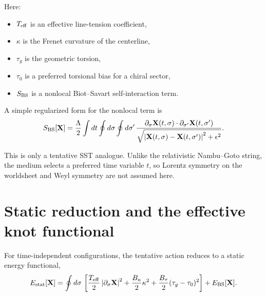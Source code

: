 \documentclass[12pt,a4paper]{article}
\begin{document}
        Here:
        \begin{itemize}
            \item \(T_{\rm eff}\) is an effective line-tension coefficient,
            \item \(\kappa\) is the Frenet curvature of the centerline,
            \item \(\tau_g\) is the geometric torsion,
            \item \(\tau_0\) is a preferred torsional bias for a chiral sector,
            \item \(S_{\rm BS}\) is a nonlocal Biot--Savart self-interaction term.
        \end{itemize}
        
        A simple regularized form for the nonlocal term is
        \begin{equation}
            S_{\rm BS}[\mathbf{X}] =
            \frac{\Lambda}{2}
            \int dt \oint d\sigma \oint d\sigma'\,
            \frac{
                \partial_\sigma \mathbf{X}(t,\sigma)\cdot
                \partial_{\sigma'} \mathbf{X}(t,\sigma')
            }{
                \sqrt{
                    \left|\mathbf{X}(t,\sigma)-\mathbf{X}(t,\sigma')\right|^2+\epsilon^2
                }
            }.
            \label{eq:BSterm}
        \end{equation}
        
        This is only a tentative SST analogue. Unlike the relativistic Nambu--Goto string, the medium selects a preferred time variable \(t\), so Lorentz symmetry on the worldsheet and Weyl symmetry are not assumed here.
    
    \section{Static reduction and the effective knot functional}
        
        For time-independent configurations, the tentative action reduces to a static energy functional,
        \begin{equation}
            E_{\rm stat}[\mathbf{X}] =
            \oint d\sigma\,
            \left[
                \frac{T_{\rm eff}}{2}\left|\partial_\sigma \mathbf{X}\right|^2
            +\frac{B_\kappa}{2}\kappa^2
            +\frac{B_\tau}{2}(\tau_g-\tau_0)^2
            \right]
            + E_{\rm BS}[\mathbf{X}].
            \label{eq:StaticEnergy}
        \end{equation}
        
\end{document}
